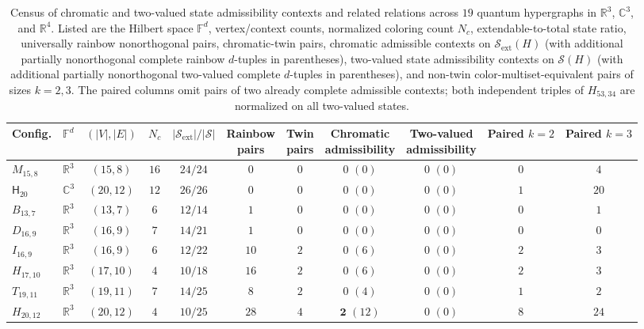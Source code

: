 \documentclass[aps,pra,reprint,superscriptaddress,longbibliography,nofootinbib,floatfix,10pt]{revtex4-2}
\theoremstyle{definition}\newtheorem{definition}[theorem]{Definition}
\theoremstyle{remark}\newtheorem{remark}[theorem]{Remark}
\newcommand{\C}{\mathbb C}\newcommand{\R}{\mathbb R}\newcommand{\Q}{\mathbb Q}
\newcommand{\F}{\mathbb F}\newcommand{\Z}{\mathbb Z}\newcommand{\PP}{\mathbb P}
\newcommand{\Sc}{\mathcal S}\newcommand{\Cc}{\mathcal C}\newcommand{\Wc}{\mathcal W}
\newcommand{\Htwenty}{\mathsf H_{20}}
\begin{document}
\begin{table}[!htbp]
\caption{Census of chromatic and two-valued state admissibility contexts and related relations across $19$ quantum hypergraphs in $\R^3$, $\C^3$, and $\R^4$. Listed are the Hilbert space $\F^d$, vertex/context counts, normalized coloring count $N_c$, extendable-to-total state ratio, universally rainbow nonorthogonal pairs, chromatic-twin pairs, chromatic admissible contexts on $\Sc_{\mathrm{ext}}(H)$ (with additional partially nonorthogonal complete rainbow $d$-tuples in parentheses), two-valued state admissibility contexts on $\Sc(H)$ (with additional partially nonorthogonal two-valued complete $d$-tuples in parentheses), and non-twin color-multiset-equivalent pairs of sizes $k=2,3$. The paired columns omit pairs of two already complete admissible contexts; both independent triples of $H_{53,34}$ are normalized on all two-valued states.}\label{tab:master-chromatic-relations}
\footnotesize\renewcommand{\arraystretch}{1.4}\setlength{\tabcolsep}{3pt}
\begin{ruledtabular}
\begin{tabular}{llccccccccc}
Config. & $\F^d$ & $(|V|,|E|)$ & $N_c$ & $|\Sc_{\mathrm{ext}}|/|\Sc|$ & \shortstack{Rainbow\\pairs} & \shortstack{Twin\\pairs} & \shortstack{Chromatic\\admissibility} & \shortstack{Two-valued\\admissibility} & Paired $k=2$ & Paired $k=3$\\\hline
$M_{15,8}$ & $\R^3$ & $(15,8)$ & $16$ & $24/24$ & $0$ & $0$ & $0$ $(0)$ & $0$ $(0)$ & $0$ & $4$\\
$\Htwenty$ & $\C^3$ & $(20,12)$ & $12$ & $26/26$ & $0$ & $0$ & $0$ $(0)$ & $0$ $(0)$ & $1$ & $20$\\
$B_{13,7}$ & $\R^3$ & $(13,7)$ & $6$ & $12/14$ & $1$ & $0$ & $0$ $(0)$ & $0$ $(0)$ & $0$ & $1$\\
$D_{16,9}$ & $\R^3$ & $(16,9)$ & $7$ & $14/21$ & $1$ & $0$ & $0$ $(0)$ & $0$ $(0)$ & $0$ & $0$\\
$I_{16,9}$ & $\R^3$ & $(16,9)$ & $6$ & $12/22$ & $10$ & $2$ & $0$ $(6)$ & $0$ $(0)$ & $2$ & $3$\\
$H_{17,10}$ & $\R^3$ & $(17,10)$ & $4$ & $10/18$ & $16$ & $2$ & $0$ $(6)$ & $0$ $(0)$ & $2$ & $3$\\
$T_{19,11}$ & $\R^3$ & $(19,11)$ & $7$ & $14/25$ & $8$ & $2$ & $0$ $(4)$ & $0$ $(0)$ & $1$ & $2$\\
$H_{20,12}$ & $\R^3$ & $(20,12)$ & $4$ & $10/25$ & $28$ & $4$ & $\mathbf{2}$ $(12)$ & $0$ $(0)$ & $8$ & $24$\\

\end{tabular}
\end{ruledtabular}
\end{table}
\end{document}
